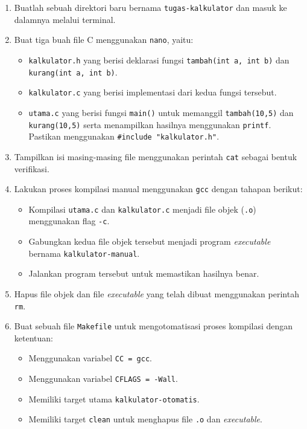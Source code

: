 \begin{enumerate}
	\item Buatlah sebuah direktori baru bernama \texttt{tugas-kalkulator} dan masuk ke dalamnya melalui terminal.

	\item Buat tiga buah file C menggunakan \texttt{nano}, yaitu:
	      \begin{itemize}
		      \item \texttt{kalkulator.h} yang berisi deklarasi fungsi \texttt{tambah(int a, int b)} dan \texttt{kurang(int a, int b)}.
		      \item \texttt{kalkulator.c} yang berisi implementasi dari kedua fungsi tersebut.
		      \item \texttt{utama.c} yang berisi fungsi \texttt{main()} untuk memanggil \texttt{tambah(10,5)} dan \texttt{kurang(10,5)} serta menampilkan hasilnya menggunakan \texttt{printf}. Pastikan menggunakan \texttt{\#include "kalkulator.h"}.
	      \end{itemize}

	\item Tampilkan isi masing-masing file menggunakan perintah \texttt{cat} sebagai bentuk verifikasi.

	\item Lakukan proses kompilasi manual menggunakan \texttt{gcc} dengan tahapan berikut:
	      \begin{itemize}
		      \item Kompilasi \texttt{utama.c} dan \texttt{kalkulator.c} menjadi file objek (\texttt{.o}) menggunakan flag \texttt{-c}.
		      \item Gabungkan kedua file objek tersebut menjadi program \textit{executable} bernama \texttt{kalkulator-manual}.
		      \item Jalankan program tersebut untuk memastikan hasilnya benar.
	      \end{itemize}

	\item Hapus file objek dan file \textit{executable} yang telah dibuat menggunakan perintah \texttt{rm}.

	\item Buat sebuah file \texttt{Makefile} untuk mengotomatisasi proses kompilasi dengan ketentuan:
	      \begin{itemize}
		      \item Menggunakan variabel \texttt{CC = gcc}.
		      \item Menggunakan variabel \texttt{CFLAGS = -Wall}.
		      \item Memiliki target utama \texttt{kalkulator-otomatis}.
		      \item Memiliki target \texttt{clean} untuk menghapus file \texttt{.o} dan \textit{executable}.
	      \end{itemize}


\end{enumerate}
